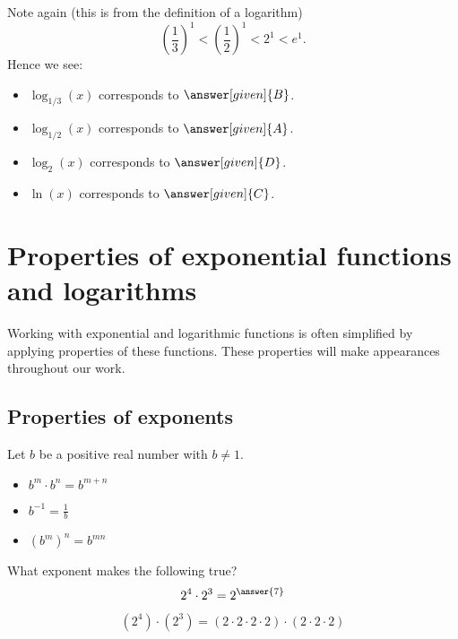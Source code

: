 \documentclass{ximera}
\begin{document}
\begin{example}
\begin{explanation}
\begin{image}
    \end{image}
    Note again (this is from the definition of a logarithm)
    \[
    \left(\frac{1}{3}\right)^1 < \left(\frac{1}{2}\right)^1  < 2^1 < e^1.
    \]
    Hence we see:
    \begin{itemize}
    \item $\log_{1/3}(x)$ corresponds to $\answer[given]{B}$.
    \item $\log_{1/2}(x)$ corresponds to $\answer[given]{A}$.
    \item $\log_2(x)$ corresponds to $\answer[given]{D}$.
    \item $\ln(x)$ corresponds to $\answer[given]{C}$.
    \end{itemize}
  \end{explanation}
\end{example}



\section{Properties of exponential functions and logarithms}

Working with exponential and logarithmic functions is often simplified by  
applying properties of these functions.  These properties will make appearances 
throughout our work.

\subsection{Properties of exponents}
Let $b$ be a positive real number with $b\ne 1$.
\begin{itemize}
  \item $b^m\cdot b^n = b^{m+n}$
  \item $b^{-1} = \frac{1}{b}$
  \item $\left(b^m\right)^n = b^{mn}$
\end{itemize}
\begin{question}
  What exponent makes the following true?
  \[
  2^4 \cdot 2^3 = 2^{\answer{7}}
  \]
  \begin{hint}
    \[
    (2^4) \cdot (2^3) = (2 \cdot 2\cdot 2 \cdot 2) \cdot  (2 \cdot 2\cdot 2)
    \]
  \end{hint}
\end{question}
\end{document}
